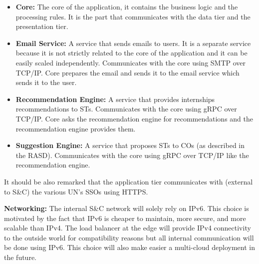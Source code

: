 \begin{itemize}
      \item \textbf{Core:} The core of the application, it contains the business logic and the processing rules. It is
            the part that communicates with the data tier and the presentation tier.
      \item \textbf{Email Service:} A service that sends emails to users. It is a separate service because it is not
            strictly related to the core of the application and it can be easily scaled independently. Communicates
            with the core using SMTP over TCP/IP. Core prepares the email and sends it to the email service which
            sends it to the user.
      \item \textbf{Recommendation Engine:} A service that provides internships recommendations to STs. Communicates
            with the core using gRPC over TCP/IP. Core asks the recommendation engine for recommendations and the
            recommendation engine provides them.
      \item \textbf{Suggestion Engine:} A service that proposes STs to COs (as described in the RASD). Communicates with
            the core using gRPC over TCP/IP like the recommendation engine.
\end{itemize}

It should be also remarked that the application tier communicates with (external to S\&C) the various UN's SSOs using
HTTPS.

\par{\textbf{Networking:}} The internal S\&C network will solely rely on IPv6. This choice is motivated by the fact that
IPv6 is cheaper to maintain, more secure, and more scalable than IPv4. The load balancer at the edge will provide IPv4
connectivity to the outside world for compatibility reasons but all internal communication will be done using IPv6.
This choice will also make easier a multi-cloud deployment in the future.
